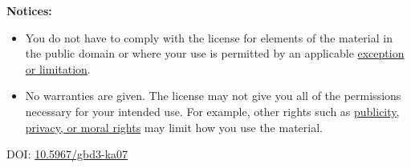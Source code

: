 \begin{flushleft}
\textbf{Notices:}

\begin{itemize}
\tightlist
\item
  You do not have to comply with the license for elements of the material in the public domain or where your use is permitted by an applicable
  \href{https://creativecommons.org/licenses/by/4.0/\#ref-exception-or-limitation}{exception or limitation}.\\
\item
  No warranties are given. The license may not give you all of the permissions necessary for your intended use. For example, other rights such as
  \href{https://creativecommons.org/licenses/by/4.0/\#ref-publicity-privacy-or-moral-rights}{publicity, privacy, or moral rights} may limit how you use the material.
\end{itemize}

\vspace{5mm}
DOI: \href{https://doi.org/10.5967/gbd3-ka07}{10.5967/gbd3-ka07}
\end{flushleft}
